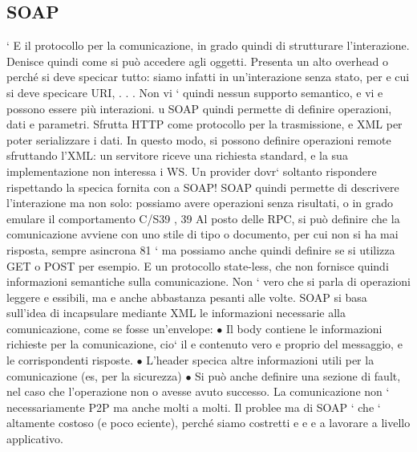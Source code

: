 \documentclass[a4paper,12pt]{article}
\begin{document}
\subsection{SOAP}
`
E il protocollo per la comunicazione, in grado quindi di strutturare l'interazione.
Denisce quindi come si può accedere agli oggetti. Presenta un alto overhead
o
perché si deve specicar tutto: siamo infatti in un'interazione senza stato, per
e
cui si deve specicare URI, . . . Non vi ` quindi nessun supporto semantico, e vi
e
possono essere più interazioni.
u
SOAP quindi permette di definire operazioni, dati e parametri. Sfrutta
HTTP come protocollo per la trasmissione, e XML per poter serializzare i dati.
In questo modo, si possono definire operazioni remote sfruttando l'XML: un
servitore riceve una richiesta standard, e la sua implementazione non interessa i
WS. Un provider dovr` soltanto rispondere rispettando la specica fornita con
a
SOAP!
SOAP quindi permette di descrivere l'interazione ma non solo: possiamo
avere operazioni senza risultati, o in grado emulare il comportamento C/S39 ,
39 Al posto delle RPC, si può definire che la comunicazione avviene con uno stile di tipo
o
documento, per cui non si ha mai risposta, sempre asincrona
81
`
ma possiamo anche quindi definire se si utilizza GET o POST per esempio. E
un protocollo state-less, che non fornisce quindi informazioni semantiche sulla
comunicazione. Non ` vero che si parla di operazioni leggere e essibili, ma
e
anche abbastanza pesanti alle volte.
SOAP si basa sull'idea di incapsulare mediante XML le informazioni necessarie alla comunicazione, come se fosse
un'envelope:
$\bullet$ Il body contiene le informazioni richieste per la comunicazione, cio` il
e
contenuto vero e proprio del messaggio, e le corrispondenti risposte.
$\bullet$ L'header specica altre informazioni utili per la comunicazione (es, per la
sicurezza)
$\bullet$ Si può anche definire una sezione di fault, nel caso che l'operazione non
o
avesse avuto successo.
La comunicazione non ` necessariamente P2P ma anche molti a molti. Il problee
ma di SOAP ` che ` altamente costoso (e poco eciente), perché siamo costretti
e
e
e
a lavorare a livello applicativo.
\end{document}

